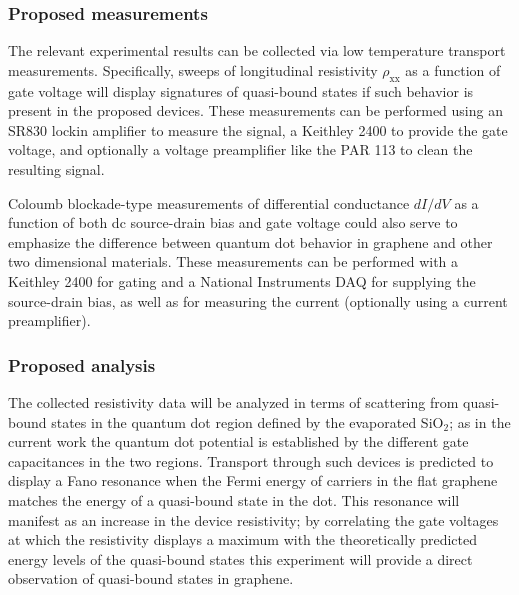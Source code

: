 \documentclass[edeposit,fullpage,draftthesis]{uiucthesis2009}
\begin{document}
        \subsubsection*{Proposed measurements}
        
            The relevant experimental results can be collected via low temperature transport
            measurements. Specifically, sweeps of longitudinal resistivity $\rho_\text{xx}$
            as a function of gate voltage will display signatures of 
            quasi-bound states if such behavior is present in the proposed devices. 
            These measurements can be performed using an SR830 lockin amplifier to measure the signal,
            a Keithley 2400 to provide the gate voltage, and optionally a voltage preamplifier
            like the PAR 113 to clean the resulting signal.
            
            Coloumb blockade-type measurements of differential conductance $dI/dV$ as a function of
            both dc source-drain bias and gate voltage could also serve to emphasize the difference
            between quantum dot behavior in graphene and other two dimensional materials. These 
            measurements can be performed with a Keithley 2400 for gating and a National Instruments DAQ
            for supplying the source-drain bias, as well as for measuring the current (optionally using
            a current preamplifier).
        
        \subsubsection*{Proposed analysis}
        
            The collected resistivity data will be analyzed in terms of scattering from quasi-bound
            states in the quantum dot region defined by the evaporated SiO$_2$; as in the current work
            the quantum dot potential is established by the different gate capacitances in the two regions.
            Transport through such devices is predicted to display a Fano
            resonance when the Fermi energy of carriers in the flat graphene matches the energy of a quasi-bound
            state in the dot. This resonance will manifest as an increase in the device resistivity; by
            correlating the gate voltages at which the resistivity displays a maximum with the theoretically
            predicted energy levels of the quasi-bound states this experiment will provide a direct observation
            of quasi-bound states in graphene.
            
\end{document}
